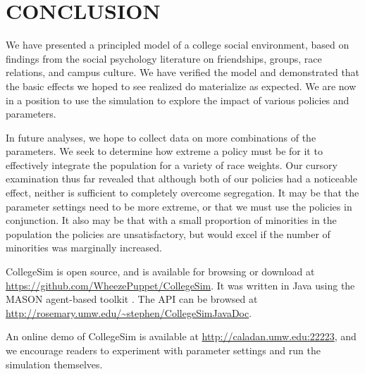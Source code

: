 
\section{CONCLUSION}
\label{sec:discussion}

We have presented a principled model of a college social environment, based on
findings from the social psychology literature on friendships, groups, race
relations, and campus culture. We have verified the model and demonstrated
that the basic effects we hoped to see realized do materialize as expected. We
are now in a position to use the simulation to explore the impact of various
policies and parameters.

In future analyses, we hope to collect data on more combinations of the
parameters. We seek to determine how extreme a policy must be for it to
effectively integrate the population for a variety of race weights. Our
cursory examination thus far revealed that although both of our policies had a
noticeable effect, neither is sufficient to completely overcome segregation.
It may be that the parameter settings need to be more extreme, or that we must
use the policies in conjunction. It also may be that with a small proportion
of minorities in the population the policies are unsatisfactory, but would
excel if the number of minorities was marginally increased. 

CollegeSim is open source, and is available for browsing or download at
\url{https://github.com/WheezePuppet/CollegeSim}. It was written in Java
using the MASON agent-based toolkit \cite{luke_mason:_2005}. The API can be
browsed at \url{http://rosemary.umw.edu/~stephen/CollegeSimJavaDoc}.

An online demo of CollegeSim is available at
\url{http://caladan.umw.edu:22223}, and we encourage readers to experiment
with parameter settings and run the simulation themselves.

